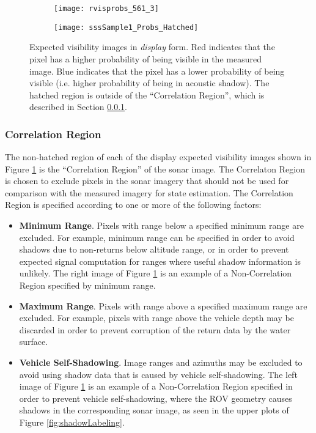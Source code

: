 \begin{figure}[!h]
	\centering
	\begin{subfigure}[b]{0.378\textwidth}
                \texttt{[image: rvisprobs\_561\_3]}
                \caption{}
  	\end{subfigure}
 	\hspace{5ex}
  	\centering
	\begin{subfigure}[b]{0.545\textwidth}
                \texttt{[image: sssSample1\_Probs\_Hatched]}
                \caption{}
  	\end{subfigure}
	\caption{Expected visibility images in \emph{display} form. Red indicates that the pixel has a higher probability of being visible in the measured image. Blue indicates that the pixel has a lower probability of being visible (i.e. higher probability of being in acoustic shadow). The hatched region is outside of the ``Correlation Region'', which is described in Section \ref{framework.Measurement.Expected.Correlation}. }	
	\label{fig:expSignals}
\end{figure}

\subsubsection{Correlation Region}
\label{framework.Measurement.Expected.Correlation}

The non-hatched region of each of the display expected visibility images shown in Figure \ref{fig:expSignals} is the ``Correlation Region'' of the sonar image.
The Correlaton Region is chosen to exclude pixels in the sonar imagery that should not be used for comparison with the measured imagery for state estimation.
The Correlation Region is specified according to one or more of the following factors:

\begin{itemize}
\item \textbf{Minimum Range}. Pixels with range below a specified minimum range are excluded. For example, minimum range can be specified in order to avoid shadows due to non-returns below altitude range, or in order to prevent expected signal computation for ranges where useful shadow information is unlikely.  The right image of Figure \ref{fig:expSignals} is an example of a Non-Correlation Region specified by minimum range.

\item \textbf{Maximum Range}. Pixels with range above a specified maximum range are excluded. For example, pixels with range above the vehicle depth may be discarded in order to prevent corruption of the return data by the water surface.

\item \textbf{Vehicle Self-Shadowing}. Image ranges and azimuths may be excluded to avoid using shadow data that is caused by vehicle self-shadowing.  The left image of Figure \ref{fig:expSignals} is an example of a Non-Correlation Region specified in order to prevent vehicle self-shadowing, where the ROV geometry causes shadows in the corresponding sonar image, as seen in the upper plots of Figure \ref{fig:shadowLabeling}.

\end{itemize}

